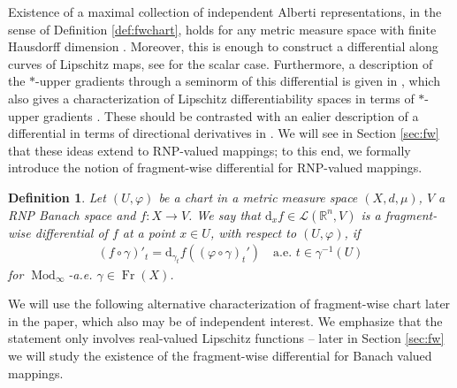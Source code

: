 \documentclass{amsart}
\newtheorem{definition}[theorem]{Definition}
\numberwithin{equation}{section}
\newcommand{\R}{\mathbb{R}}
\newcommand{\leb}{\mathcal{L}}
\newcommand{\Mod}{\operatorname{Mod}}
\newcommand{\Fr}{\operatorname{Fr}}
\newcommand{\ud}{\mathrm {d}}
\begin{document}
Existence of a maximal collection of independent Alberti representations, in the sense of Definition \ref{def:fwchart}, holds for any metric measure space with finite Hausdorff dimension \cite[Theorem 5.5]{tsd24}. Moreover, this is enough to construct a differential along curves of Lipschitz maps, see \cite[Theorem 1.2]{tsd24} for the scalar case. Furthermore, a description of the $*$-upper gradients through a seminorm of this differential is given in \cite{tsd24}, which also gives a characterization of Lipschitz differentiability spaces in terms of $*$-upper gradients \cite[Theorem 1.5]{tsd24}. These should be contrasted with an ealier description of a differential in terms of directional derivatives in \cite[Corollary 2.13]{bate12diff}. We will see in Section \ref{sec:fw} that these ideas extend to RNP-valued mappings; to this end, we formally introduce the notion of fragment-wise differential for RNP-valued mappings.
\begin{definition}
Let $(U,\varphi )$ be a chart in a metric measure space $(X,d,\mu )$, $V$ a RNP Banach space and $f:X\rightarrow V$. We say that $\ud_xf\in \leb(\R^n,V)$ is a fragment-wise differential of $f$ at a point $x\in U$, with respect to $(U,\varphi )$, if
\begin{align*}
(f\circ\gamma)'_t= \ud_{\gamma_t}f((\varphi\circ\gamma)_t')\quad\textrm{a.e. }t\in \gamma^{-1} (U)
\end{align*}
for $\Mod_\infty$-a.e. $\gamma\in\Fr(X)$. 
\end{definition}

We will use the following alternative characterization of fragment-wise chart later in the paper, which also may be of independent interest. We emphasize that the statement only involves real-valued Lipschitz functions -- later in Section \ref{sec:fw} we will study the existence of the fragment-wise  differential for Banach valued mappings. 
\end{document}
